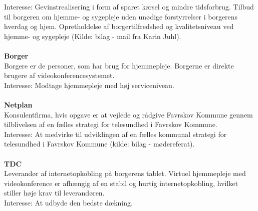 \documentclass[10pt,a4paper]{article}
\begin{document}
	Interesse: Gevinstrealisering i form af sparet kørsel og mindre tidsforbrug. Tilbud til borgeren om hjemme- og sygepleje uden unødige forstyrrelser i borgerens hverdag og hjem. Opretholdelse af borgertilfredshed og kvalitetsniveau ved hjemme- og sygepleje (Kilde: bilag - mail fra Karin Juhl).\\ \\
	\textbf{Borger}\\
	Borgere er de personer, som har brug for hjemmepleje. Borgerne er direkte brugere af videokonferencesystemet.\\
	Interesse: Modtage hjemmepleje med høj serviceniveau.\\ \\
	\textbf{Netplan}\\
	Konsulentfirma\cite{netplan}, hvis opgave er at vejlede og rådgive Favrskov Kommune gennem tilblivelsen af en fælles strategi for telesundhed i Favrskov Kommune.\\
	Interesse: At medvirke til udviklingen af en fælles kommunal strategi for telesundhed i Favrskov Kommune (kilde: bilag - mødereferat).\\ \\
	\textbf{TDC}\\
	Leverandør af internetopkobling på borgerens tablet. Virtuel hjemmepleje med videokonference er afhængig af en stabil og hurtig internetopkobling, hvilket stiller høje krav til leverandøren. \\
	Interesse: At udbyde den bedste dækning.
	\printbibliography[title=Referencer]
\end{document}
